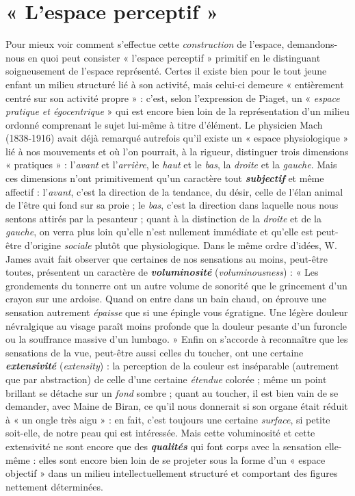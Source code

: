 \section{« L’espace perceptif »}%
Pour mieux voir comment s’effectue
cette {\it construction} de l’espace, demandons-nous en quoi peut
consister « l’espace perceptif » primitif en le distinguant soigneusement
de l’espace représenté. Certes il existe bien pour le tout jeune
enfant un milieu structuré lié à son activité, mais celui-ci demeure
« entièrement centré sur son activité propre » : c’est, selon l’expression
de Piaget, un « {\it espace pratique et égocentrique} » qui est encore
bien loin de la représentation d’un milieu ordonné comprenant le
sujet lui-même à titre d’élément. Le physicien Mach (1838-1916)
avait déjà remarqué autrefois qu’il existe un « espace physiologique »
lié à nos mouvements et où l’on pourrait, à la rigueur, distinguer
trois dimensions « pratiques » : l’{\it avant} et l'{\it arrière}, le {\it haut} et le {\it bas}, la
{\it droite} et la {\it gauche}. Mais ces dimensions n’ont primitivement qu’un
caractère tout \textbf{\textit {subjectif}} et même affectif : l'{\it avant}, c’est la direction
de la tendance, du désir, celle de l’élan animal de l’être qui fond sur
sa proie ; le {\it bas}, c’est la direction dans laquelle nous nous sentons
attirés par la pesanteur ; quant à la distinction de la {\it droite} et de la
{\it gauche}, on verra plus loin qu’elle n’est nullement immédiate et qu’elle
est peut-être d’origine {\it sociale} plutôt que physiologique. Dans le même
ordre d’idées, W. James avait fait observer que certaines de nos
sensations au moins, peut-être toutes, présentent un caractère de
\textbf{\textit {voluminosité}} ({\it voluminousness}) : « Les grondements du tonnerre ont un
autre volume de sonorité que le grincement d’un crayon sur une
ardoise. Quand on entre dans un bain chaud, on éprouve une sensation
autrement {\it épaisse} que si une épingle vous égratigne. Une légère
douleur névralgique au visage paraît moins profonde que la douleur
pesante d’un furoncle ou la souffrance massive d’un lumbago. » Enfin
on s’accorde à reconnaître que les sensations de la vue, peut-être
aussi celles du toucher, ont une certaine \textbf{\textit {extensivité}} ({\it extensity}) : la
perception de la couleur est inséparable (autrement que par abstraction)
de celle d’une certaine {\it étendue} colorée ; même un point brillant
se détache sur un {\it fond} sombre ; quant au toucher, il est bien vain de
se demander, avec Maine de Biran, ce qu’il nous donnerait si son
organe était réduit à « un ongle très aigu » : en fait, c’est toujours une
certaine {\it surface}, si petite soit-elle, de notre peau qui est intéressée.
Mais cette voluminosité et cette extensivité ne sont encore que des
\textbf{\textit {qualités}} qui font corps avec la sensation elle-même : elles sont encore
bien loin de se projeter sous la forme d’un « espace objectif » dans un
milieu intellectuellement structuré et comportant des figures nettement
déterminées.

